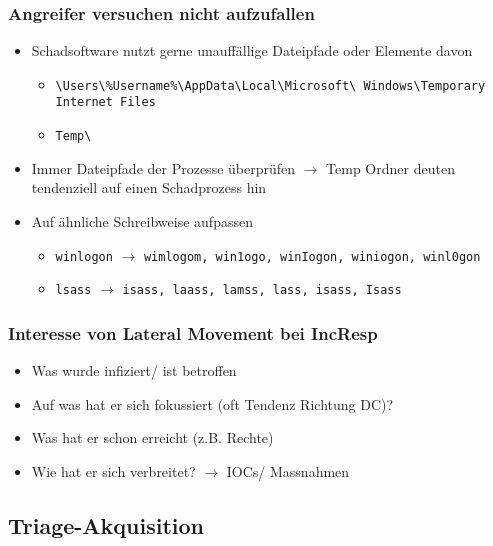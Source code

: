 \subsubsection{Angreifer versuchen nicht aufzufallen}
\begin{itemize}
    \item Schadsoftware nutzt gerne unauffällige Dateipfade oder Elemente davon
    \begin{itemize}
        \item \lstinline|\Users\%Username%\AppData\Local\Microsoft\ Windows\Temporary Internet Files|
        \item \lstinline|Temp\|
    \end{itemize}
    \item Immer Dateipfade der Prozesse überprüfen $\rightarrow$ Temp Ordner deuten tendenziell auf einen Schadprozess hin
    \item Auf ähnliche Schreibweise aufpassen
    \begin{itemize}
        \item \lstinline|winlogon| $\rightarrow$ \lstinline|wimlogom, win1ogo, winIogon, winiogon, winl0gon|
        \item \lstinline|lsass| $\rightarrow$ \lstinline|isass, laass, lamss, lass, isass, Isass|
    \end{itemize}
\end{itemize}

\subsubsection{Interesse von Lateral Movement bei IncResp}
\begin{itemize}
    \item Was wurde infiziert/ ist betroffen
    \item Auf was hat er sich fokussiert (oft Tendenz Richtung DC)?
    \item Was hat er schon erreicht (z.B. Rechte)
    \item Wie hat er sich verbreitet? $\rightarrow$ IOCs/ Massnahmen
\end{itemize}

\subsection{Triage-Akquisition}

